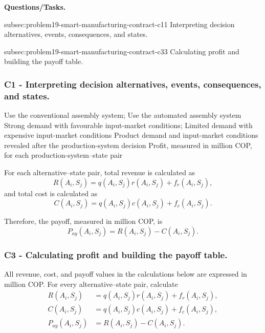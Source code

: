 \textbf{Questions/Tasks.}
\begin{enumerate}
	\CriterionTask
	{subsec:problem19-smart-manufacturing-contract-c1}{1}
	{Interpreting decision alternatives, events, consequences, and states.}
	
	\CriterionTask
	{subsec:problem19-smart-manufacturing-contract-c3}{3}
	{Calculating profit and building the payoff table.}
\end{enumerate}

\subsubsection*{C1 - Interpreting decision alternatives, events, consequences, and states.}
\label{subsec:problem19-smart-manufacturing-contract-c1}

\DecisionElementsTable
{Use the conventional assembly system; Use the automated assembly system}
{Strong demand with favourable input-market conditions; Limited demand with expensive input-market conditions}
{Product demand and input-market conditions revealed after the production-system decision}
{Profit, measured in million COP, for each production-system--state pair}

For each alternative--state pair, total revenue is calculated as
\[
R(A_i,S_j)
=
q(A_i,S_j)r(A_i,S_j)
+
f_r(A_i,S_j),
\]
and total cost is calculated as
\[
C(A_i,S_j)
=
q(A_i,S_j)c(A_i,S_j)
+
f_c(A_i,S_j).
\]

Therefore, the payoff, measured in million COP, is
\[
P_{ay}(A_i,S_j)
=
R(A_i,S_j)-C(A_i,S_j).
\]


\subsubsection*{C3 - Calculating profit and building the payoff table.}
\label{subsec:problem19-smart-manufacturing-contract-c3}

All revenue, cost, and payoff values in the calculations below are expressed
in million COP. For every alternative--state pair, calculate
\[
\begin{aligned}
	R(A_i,S_j)
	&=
	q(A_i,S_j)r(A_i,S_j)
	+
	f_r(A_i,S_j),
	\\
	C(A_i,S_j)
	&=
	q(A_i,S_j)c(A_i,S_j)
	+
	f_c(A_i,S_j),
	\\
	P_{ay}(A_i,S_j)
	&=
	R(A_i,S_j)-C(A_i,S_j).
\end{aligned}
\]

